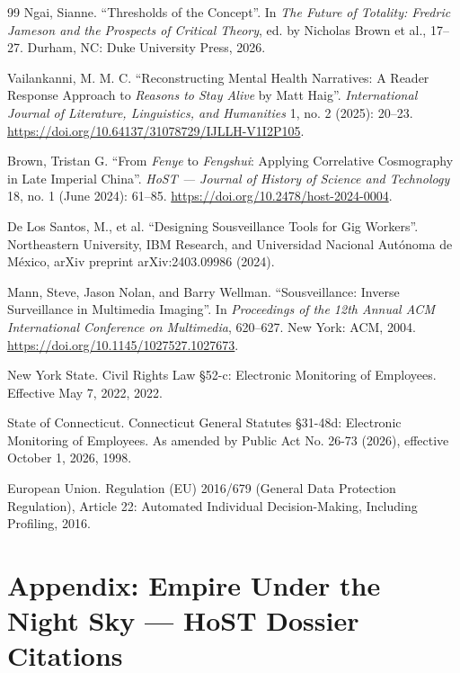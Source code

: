 \documentclass[10pt]{article}
\begin{document}
\begin{thebibliography}{99}
 Ngai, Sianne. ``Thresholds of the Concept''. In \emph{The Future of Totality: Fredric Jameson and the Prospects of Critical Theory}, ed. by Nicholas Brown et al., 17--27. Durham, NC: Duke University Press, 2026.

 Vailankanni, M. M. C. ``Reconstructing Mental Health Narratives: A Reader Response Approach to \emph{Reasons to Stay Alive} by Matt Haig''. \emph{International Journal of Literature, Linguistics, and Humanities} 1, no. 2 (2025): 20--23. \url{https://doi.org/10.64137/31078729/IJLLH-V1I2P105}.

 Brown, Tristan G. ``From \emph{Fenye} to \emph{Fengshui}: Applying Correlative Cosmography in Late Imperial China''. \emph{HoST --- Journal of History of Science and Technology} 18, no. 1 (June 2024): 61--85. \url{https://doi.org/10.2478/host-2024-0004}.

 De Los Santos, M., et al. ``Designing Sousveillance Tools for Gig Workers''. Northeastern University, IBM Research, and Universidad Nacional Aut\'onoma de M\'exico, arXiv preprint arXiv:2403.09986 (2024).

 Mann, Steve, Jason Nolan, and Barry Wellman. ``Sousveillance: Inverse Surveillance in Multimedia Imaging''. In \emph{Proceedings of the 12th Annual ACM International Conference on Multimedia}, 620--627. New York: ACM, 2004. \url{https://doi.org/10.1145/1027527.1027673}.

 New York State. Civil Rights Law \S 52-c: Electronic Monitoring of Employees. Effective May 7, 2022, 2022.

 State of Connecticut. Connecticut General Statutes \S 31-48d: Electronic Monitoring of Employees. As amended by Public Act No. 26-73 (2026), effective October 1, 2026, 1998.

 European Union. Regulation (EU) 2016/679 (General Data Protection Regulation), Article 22: Automated Individual Decision-Making, Including Profiling, 2016.

\end{thebibliography}

\newpage
\appendix
\section*{Appendix: Empire Under the Night Sky --- HoST Dossier Citations}
\end{document}
